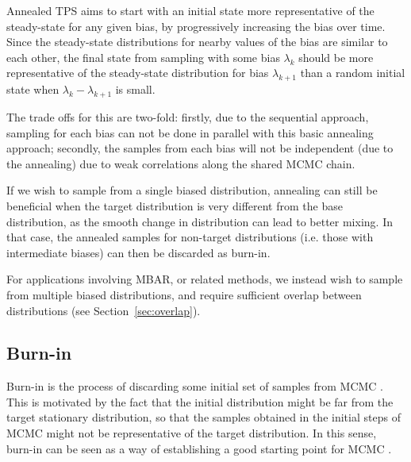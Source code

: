 \documentclass{article}
\begin{document}
Annealed TPS aims to start with an initial state more representative of the steady-state for any given bias, by progressively increasing the bias over time. Since the steady-state distributions for nearby
values of the bias are similar to each other, the final state from sampling with some bias $\lambda_{k}$ should be more representative of the steady-state distribution for bias $\lambda_{k+1}$ than a random initial state when $\lambda_k - \lambda_{k+1}$ is small.

The trade offs for this are two-fold: firstly, due to the sequential approach, sampling for each bias can not be done in parallel with this basic annealing approach; secondly, the samples from each bias will not be independent (due to the annealing) due to weak correlations along the shared MCMC chain.

If we wish to sample from a single biased distribution, annealing can still be beneficial when the target distribution is very different from the base distribution, as the smooth change in distribution can lead to better mixing. In that case,
the annealed samples for non-target distributions (i.e. those with intermediate biases) can then be discarded as burn-in.

For applications involving MBAR, or related methods, we instead wish to sample from multiple biased distributions, and require sufficient overlap between distributions (see Section~\ref{sec:overlap}).

\subsection{Burn-in}\label{appendix:burnin}
Burn-in is the process of discarding some initial set of samples from MCMC \cite{roy2020convergence}. This is motivated by the fact that the initial distribution might be far from the target stationary distribution, so that the samples obtained in the initial steps of MCMC might not be representative of the target distribution.
In this sense, burn-in can be seen as a way of establishing a good starting point for MCMC \cite{brooks2011handbook}.
\end{document}
